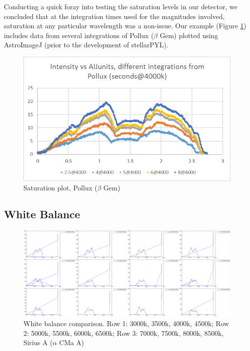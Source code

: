 \documentclass[prb,preprint]{revtex4-1}
\begin{document}
	Conducting a quick foray into testing the saturation levels in our detector, we concluded that at the integration times used for the magnitudes involved, saturation at any particular wavelength was a non-issue. Our example (Figure \ref{fig:1}) includes data from several integrations of Pollux ($\beta$ Gem) plotted using AstroImageJ (prior to the development of stellarPYL).
	
	\begin{figure}[!h]
		\includegraphics{saturation}
		\caption{Saturation plot, Pollux ($\beta$ Gem)}\label{fig:1}
	\end{figure}
	
	\subsection{White Balance}
	
	\begin{figure}[!h]
		\includegraphics[keepaspectratio,scale=.132]{allLTR-UTD.jpg}
		\caption{White balance comparison. Row 1: 3000k, 3500k, 4000k, 4500k; Row 2: 5000k, 5500k, 6000k, 6500k; Row 3: 7000k, 7500k, 8000k, 8500k, Sirius A ($\alpha$ CMa A)}\label{fig:2}
	\end{figure}
	
\end{document}
